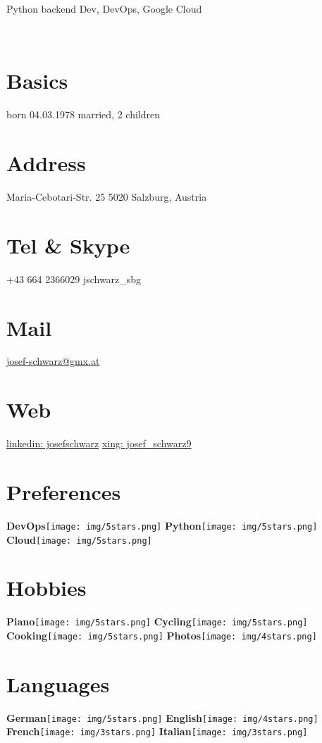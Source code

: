 \documentclass[]{friggeri-cv}
\begin{document}
      {Python backend Dev, DevOps, Google Cloud}
      

\begin{aside}
    ~
    ~
    ~
    ~
    ~
  \section{Basics}
    born 04.03.1978
    married, 2 children
    ~    
  \section{Address}
    Maria-Cebotari-Str. 25
    5020 Salzburg, Austria
    ~
  \section{Tel \& Skype}
    +43 664 2366029
    jschwarz\_sbg
    ~
  \section{Mail}
    \href{mailto:josef-schwarz@gmx.at}{josef-schwarz@gmx.at}
    ~
  \section{Web}
    \href{https://www.linkedin.com/in/josefschwarz/}{linkedin: josefschwarz}   \href{https://www.xing.com/profile/Josef\_Schwarz9/cv}{xing: josef\_schwarz9}
    ~
    ~
    ~
    ~
    ~
    ~
    ~
    ~
    ~
    ~
    ~
    ~
    ~
    ~
  \section{Preferences}
    \textbf{DevOps}\texttt{[image: img/5stars.png]}
    \textbf{Python}\texttt{[image: img/5stars.png]}
    \textbf{Cloud}\texttt{[image: img/5stars.png]}
    ~
  \section{Hobbies}
    \textbf{Piano}\texttt{[image: img/5stars.png]}
    \textbf{Cycling}\texttt{[image: img/5stars.png]}      
    \textbf{Cooking}\texttt{[image: img/5stars.png]}     
    \textbf{Photos}\texttt{[image: img/4stars.png]}
    ~   
  \section{Languages}
    \textbf{German}\texttt{[image: img/5stars.png]}
    \textbf{English}\texttt{[image: img/4stars.png]}    
    \textbf{French}\texttt{[image: img/3stars.png]}
    \textbf{Italian}\texttt{[image: img/3stars.png]}    
    ~
\end{aside}
\end{document}
